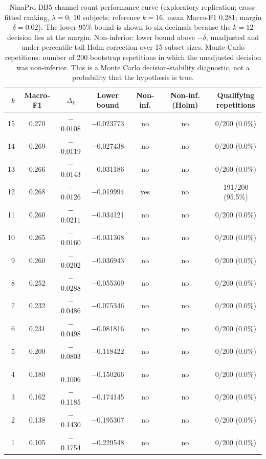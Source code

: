 \begin{table}[htbp]
\centering
\small
\caption{NinaPro DB5 channel-count performance curve (exploratory replication; cross-fitted ranking, $\lambda = 0$; 10 subjects; reference $k = 16$, mean Macro-F1 0.281; margin $\delta = 0.02$). The lower 95\% bound is shown to six decimals because the $k = 12$ decision lies at the margin. Non-inferior: lower bound above $-\delta$, unadjusted and under percentile-tail Holm correction over 15 subset sizes. Monte Carlo repetitions: number of 200 bootstrap repetitions in which the unadjusted decision was non-inferior. This is a Monte Carlo decision-stability diagnostic, not a probability that the hypothesis is true.}
\label{tab:replication}
\setlength{\tabcolsep}{4pt}
\begin{adjustbox}{max width=\textwidth}
\begin{tabular}{rcccccc}
\toprule
$k$ & Macro-F1 & $\Delta_k$ & Lower bound & Non-inf. & Non-inf. (Holm) & \makecell{Qualifying\\repetitions} \\
\midrule
15 & 0.270 & $-$0.0108 & $-$0.023773 & no & no & 0/200 (0.0\%) \\
14 & 0.269 & $-$0.0119 & $-$0.027438 & no & no & 0/200 (0.0\%) \\
13 & 0.266 & $-$0.0143 & $-$0.031186 & no & no & 0/200 (0.0\%) \\
12 & 0.268 & $-$0.0126 & $-$0.019994 & yes & no & 191/200 (95.5\%) \\
11 & 0.260 & $-$0.0211 & $-$0.034121 & no & no & 0/200 (0.0\%) \\
10 & 0.265 & $-$0.0160 & $-$0.031368 & no & no & 0/200 (0.0\%) \\
9 & 0.260 & $-$0.0202 & $-$0.036943 & no & no & 0/200 (0.0\%) \\
8 & 0.252 & $-$0.0288 & $-$0.055369 & no & no & 0/200 (0.0\%) \\
7 & 0.232 & $-$0.0486 & $-$0.075346 & no & no & 0/200 (0.0\%) \\
6 & 0.231 & $-$0.0498 & $-$0.081816 & no & no & 0/200 (0.0\%) \\
5 & 0.200 & $-$0.0803 & $-$0.118422 & no & no & 0/200 (0.0\%) \\
4 & 0.180 & $-$0.1006 & $-$0.150266 & no & no & 0/200 (0.0\%) \\
3 & 0.162 & $-$0.1185 & $-$0.174145 & no & no & 0/200 (0.0\%) \\
2 & 0.138 & $-$0.1430 & $-$0.195307 & no & no & 0/200 (0.0\%) \\
1 & 0.105 & $-$0.1754 & $-$0.229548 & no & no & 0/200 (0.0\%) \\
\bottomrule
\end{tabular}
\end{adjustbox}
\end{table}
